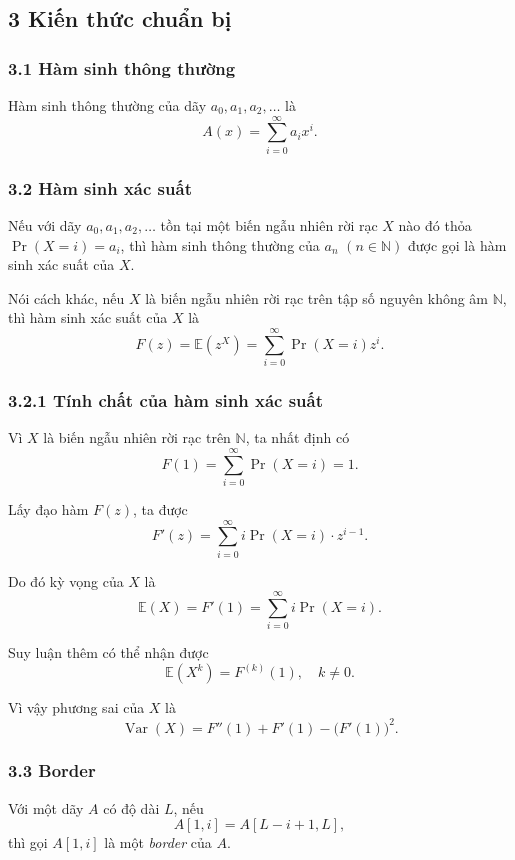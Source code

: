 \documentclass[11pt]{article}
\begin{document}
\subsection*{3 Kiến thức chuẩn bị}

\subsubsection*{3.1 Hàm sinh thông thường}

Hàm sinh thông thường của dãy \(a_0,a_1,a_2,\ldots\) là
\[
  A(x)=\sum_{i=0}^{\infty} a_i x^i .
\]

\subsubsection*{3.2 Hàm sinh xác suất}

Nếu với dãy \(a_0,a_1,a_2,\ldots\) tồn tại một biến ngẫu nhiên rời rạc \(X\) nào
đó thỏa \(\Pr(X=i)=a_i\), thì hàm sinh thông thường của \(a_n\)
\((n\in\mathbb{N})\) được gọi là hàm sinh xác suất của \(X\).

Nói cách khác, nếu \(X\) là biến ngẫu nhiên rời rạc trên tập số nguyên không âm
\(\mathbb{N}\), thì hàm sinh xác suất của \(X\) là
\[
  F(z)=\mathbb{E}(z^X)=\sum_{i=0}^{\infty}\Pr(X=i)z^i .
\]

\subsubsection*{3.2.1 Tính chất của hàm sinh xác suất}

Vì \(X\) là biến ngẫu nhiên rời rạc trên \(\mathbb{N}\), ta nhất định có
\[
  F(1)=\sum_{i=0}^{\infty}\Pr(X=i)=1 .
\]

Lấy đạo hàm \(F(z)\), ta được
\[
  F'(z)=\sum_{i=0}^{\infty} i\Pr(X=i)\cdot z^{i-1}.
\]

Do đó kỳ vọng của \(X\) là
\[
  \mathbb{E}(X)=F'(1)=\sum_{i=0}^{\infty} i\Pr(X=i).
\]

Suy luận thêm có thể nhận được
\[
  \mathbb{E}(X^k)=F^{(k)}(1),\quad k\ne 0 .
\]

Vì vậy phương sai của \(X\) là
\[
  \operatorname{Var}(X)=F''(1)+F'(1)-\bigl(F'(1)\bigr)^2 .
\]

\subsubsection*{3.3 Border}

Với một dãy \(A\) có độ dài \(L\), nếu
\[
  A[1,i]=A[L-i+1,L],
\]
thì gọi \(A[1,i]\) là một \emph{border} của \(A\).
\end{document}
